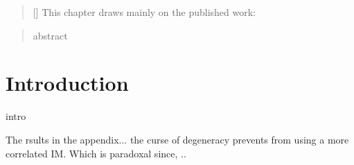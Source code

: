 


\begin{abstract}[\hspace*{-10pt}]
    This chapter draws mainly on the published work:   %
\end{abstract}

\begin{abstract}
    abstract
\end{abstract}

\minitoc


\section{Introduction}


intro



The rsults in the appendix... the curse of degeneracy prevents  from using a more correlated IM. Which  is paradoxal since, ..
